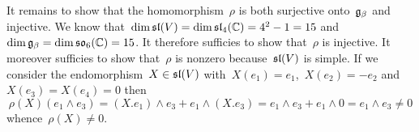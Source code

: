 It remains to show that the homomorphism~$\rho$ is both surjective onto~$\mathfrak{g}_\beta$ and injective.
We know that~$\dim \mathfrak{sl}(V) = \dim \mathfrak{sl}_4(\mathbb{C}) = 4^2 - 1 = 15$ and~$\dim \mathfrak{g}_\beta = \dim \mathfrak{so}_6(\mathbb{C}) = 15$.
It therefore sufficies to show that~$\rho$ is injective.
It moreover sufficies to show that~$\rho$ is nonzero because~$\mathfrak{sl}(V)$ is simple.
If we consider the endomorphism~$X \in \mathfrak{sl}(V)$ with~$X(e_1) = e_1$,~$X(e_2) = -e_2$ and~$X(e_3) = X(e_4) = 0$ then
\[
  \rho(X)(e_1 \wedge e_3)
  =
  (X.e_1) \wedge e_3 + e_1 \wedge (X.e_3)
  =
  e_1 \wedge e_3 + e_1 \wedge 0
  =
  e_1 \wedge e_3
  \neq
  0
\]
whence~$\rho(X) \neq 0$.




